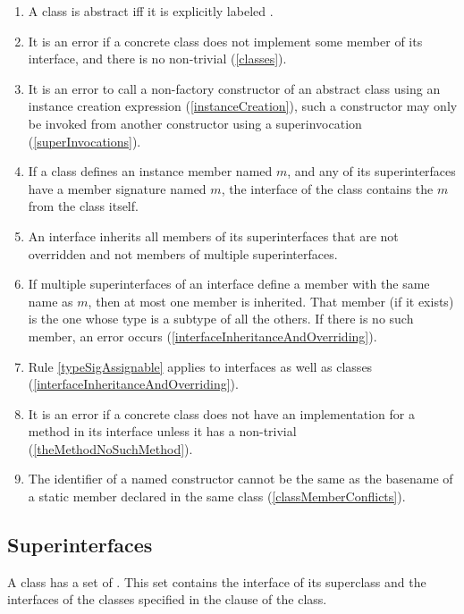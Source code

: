 \documentclass[makeidx]{article}
\begin{document}
{\begin{enumerate}
    (\ref{abstractInstanceMembers}, \ref{externalFunctions}).
  \item A class is abstract if{}f it is explicitly labeled \ABSTRACT.
  \item It is an error if a concrete class does not implement some member
    of its interface, and there is no non-trivial 
    (\ref{classes}).
  \item It is an error to call a non-factory constructor of an abstract class
    using an instance creation expression (\ref{instanceCreation}),
    such a constructor may only be invoked from another constructor
    using a superinvocation (\ref{superInvocations}).
  \item If a class defines an instance member named $m$,
    and any of its superinterfaces have a member signature named $m$,
    the interface of the class contains the $m$ from the class itself.
  \item An interface inherits all members of its superinterfaces
    that are not overridden and not members of multiple superinterfaces.
  \item If multiple superinterfaces of an interface
    define a member with the same name as $m$,
    then at most one member is inherited.
    That member (if it exists) is the one whose type is a subtype
    of all the others.
    If there is no such member, an error occurs
    (\ref{interfaceInheritanceAndOverriding}).
  \item Rule \ref{typeSigAssignable} applies to interfaces as well as classes
    (\ref{interfaceInheritanceAndOverriding}).
  \item It is an error if a concrete class does not have an implementation
    for a method in its interface
    unless it has a non-trivial 
    (\ref{theMethodNoSuchMethod}).
  \item The identifier of a named constructor cannot be the same as
    the basename of a static member declared in the same class
    (\ref{classMemberConflicts}).
  \end{enumerate}%
}


\subsection{Superinterfaces}

\LMHash{}%
A class has a set of .
This set contains the interface of its superclass
and the interfaces of the classes specified in
the \IMPLEMENTS{} clause of the class.
\end{document}
